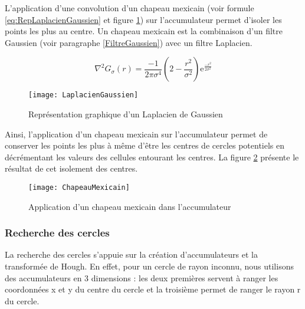 L’application d’une convolution d’un chapeau mexicain (voir formule \eqref{eq:RepLaplacienGaussien} et figure \ref{fig:LaplacienGaussien}) sur l’accumulateur permet d’isoler les points les plus au centre. Un chapeau mexicain est la combinaison d’un filtre Gaussien (voir paragraphe \ref{FiltreGaussien}) avec un filtre Laplacien.

\begin{equation}
\nabla^2G_\sigma(r) = \frac{-1}{2\pi\sigma^4}(2-\frac{r^2}{\sigma^2}) \mathrm{e}^{\frac{-r^2}{2\sigma^2}}
\label{eq:RepLaplacienGaussien}
\end{equation}

\begin{figure}[H]
  \centering
  \texttt{[image: LaplacienGaussien]}
  \caption{Représentation graphique d’un Laplacien de Gaussien}
  \label{fig:LaplacienGaussien}
\end{figure}

Ainsi, l’application d’un chapeau mexicain sur l’accumulateur permet de conserver les points les plus à même d’être les centres de cercles potentiels en décrémentant les valeurs des cellules entourant les centres. La figure \ref{fig:ChapeauMexicain} présente le résultat de cet isolement des centres.

\begin{figure}[H]
  \centering
  \texttt{[image: ChapeauMexicain]}
  \caption{Application d’un chapeau mexicain dans l’accumulateur}
  \label{fig:ChapeauMexicain}
\end{figure}

\subsubsection{Recherche des cercles}

La recherche des cercles s’appuie sur la création d’accumulateurs et la transformée de Hough. En effet, pour un cercle de rayon inconnu, nous utilisons des accumulateurs en 3 dimensions : les deux premières servent à ranger les coordonnées x et y du centre du cercle et la troisième permet de ranger le rayon r du cercle. 

